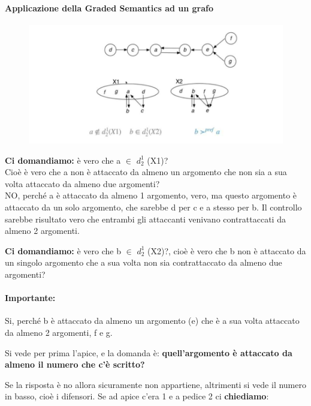 \paragraph{Applicazione della Graded Semantics ad un grafo}
\begin{figure}[H]
    \centering
    \includegraphics[width=12cm, keepaspectratio]{capitoli/img/Cap8/GdefnseGrafo.png}
\end{figure}
\textbf{Ci domandiamo:} è vero che a $\in$ $d^1_2$ (X1)? \\Cioè è
vero che a non è attaccato da almeno un argomento che non sia a sua volta
attaccato da almeno due argomenti? \\NO, perché a è attaccato da almeno 1
argomento, vero, ma questo argomento è attaccato da un solo argomento, che
sarebbe d per c e a stesso per b. Il controllo sarebbe risultato vero che
entrambi gli attaccanti venivano contrattaccati da almeno 2 argomenti.

\vspace{0.4cm}

\noindent \textbf{Ci domandiamo:} è vero che b $\in$ $d^1_2$ (X2)?, cioè è
vero che b non è attaccato da un singolo argomento che a sua volta non sia
contrattaccato da almeno due argomenti?

\paragraph{Importante:} Si, perché b è attaccato da almeno un
argomento (e) che è a sua volta attaccato da almeno 2 argomenti, f e g.

\vspace{0.3cm}

\noindent Si vede per prima l'apice, e la domanda è: \textbf{quell'argomento
    è attaccato da almeno il numero che c'è scritto?}

\vspace{0.3cm}

\noindent Se la risposta è no allora sicuramente non appartiene, altrimenti
si vede il numero in basso, cioè i difensori.
\vspace{0.3cm}
\noindent Se ad apice c'era 1 e a pedice 2 ci \textbf{chiediamo}:

